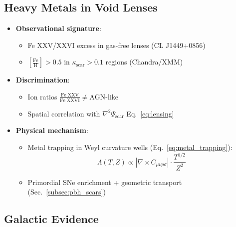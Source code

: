 \documentclass{article}
\begin{document}
\subsection{Heavy Metals in Void Lenses}\label{subsec:metals}
\begin{itemize}
    \item \textbf{Observational signature}: 
    \begin{itemize}
        \item Fe XXV/XXVI excess in gas-free lenses (CL J1449+0856)
        \item $\left[\frac{\text{Fe}}{\text{H}}\right] > 0.5$ in $\kappa_{\text{scar}} > 0.1$ regions (Chandra/XMM)
    \end{itemize}
    
    \item \textbf{Discrimination}: 
    \begin{itemize}
        \item Ion ratios  $\frac{\text{Fe XXV}}{\text{Fe XXVI}} \neq \text{AGN}$-like
        \item Spatial correlation with $\nabla^2 \Psi_{\text{scar}}$ Eq.~\ref{eq:lensing}
    \end{itemize}
    
    \item \textbf{Physical mechanism}:
    \begin{itemize}
        \item Metal trapping in Weyl curvature wells (Eq.~\ref{eq:metal_trapping}):
        \[
        \Lambda(T,Z) \propto \left|\nabla \times C_{\mu\nu\rho\sigma}\right| \cdot \frac{T^{1/2}}{Z^2}
        \]
        \item Primordial SNe enrichment + geometric transport (Sec.~\ref{subsec:pbh_scars})
    \end{itemize}
\end{itemize}


\subsection{Galactic Evidence}
\label{subsec:galactic}
\end{document}
